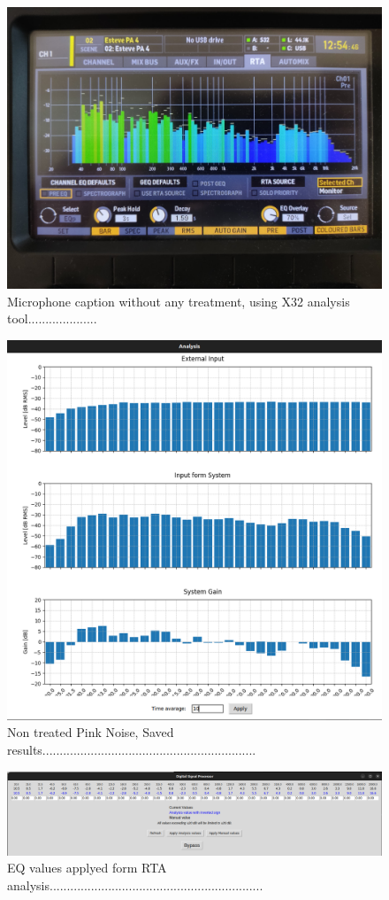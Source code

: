 \begin{figure}[H]
	\centering
	\includegraphics[width=0.6
	\linewidth]{Figures/Coro_X32_nontreated.jpeg}
	\caption{Microphone caption without any treatment, using X32 analysis tool....................}
	\label{fig:Coro_X32_nontreated}
\end{figure}

\begin{figure}[H]
	\centering
	\includegraphics[width=0.6
	\linewidth]{Figures/Coro_RTA_Saved.png}
	\caption{Non treated Pink Noise, Saved results..............................................................}
	\label{fig:Coro_RTA_saved}
\end{figure}

\begin{figure}[H]
	\centering
	\includegraphics[width=1
	\linewidth]{Figures/Coro_EQ_from_RTA.png}
	\caption{EQ values applyed form RTA analysis..............................................................}
	\label{fig:Coro_EQ_RTA+C}
\end{figure}

